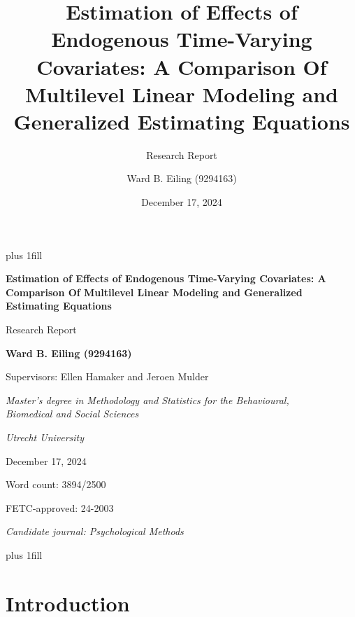 \documentclass[
  11pt,
  a4paper,
]{article}
\title{Estimation of Effects of Endogenous Time-Varying Covariates: A
Comparison Of Multilevel Linear Modeling and Generalized Estimating
Equations}
\subtitle{Research Report}
\author{Ward B. Eiling (9294163)}
\date{December 17, 2024}
\begin{document}
\cleardoublepage
\thispagestyle{empty}
{\centering
\hbox{}\vskip 0cm plus 1fill
{\Large\bfseries Estimation of Effects of Endogenous Time-Varying
Covariates: A Comparison Of Multilevel Linear Modeling and Generalized
Estimating Equations \par}
\vspace{3ex}
{\large Research Report \par}
\vspace{9ex}
{\large\bfseries Ward B. Eiling (9294163) \par}
\vspace{3ex}
{\large Supervisors: Ellen Hamaker and Jeroen Mulder \par}
\vspace{9ex}
{\normalsize \textit{Master's degree in Methodology and Statistics for the Behavioural, \\ Biomedical and Social Sciences} \par}
\vspace{3ex}
{\normalsize \textit{Utrecht University} \par}
\vspace{9ex}
{\normalsize December 17, 2024 \par}
\vspace{3ex}
{\normalsize Word count: 3894/2500 \par}
\vspace{9ex}
{\normalsize FETC-approved: 24-2003 \par}
\vspace{9ex}
{\normalsize \textit{Candidate journal: Psychological Methods} \par}
\hbox{}\vskip 0cm plus 1fill
}


\newpage

\section{Introduction}\label{introduction}
\end{document}
